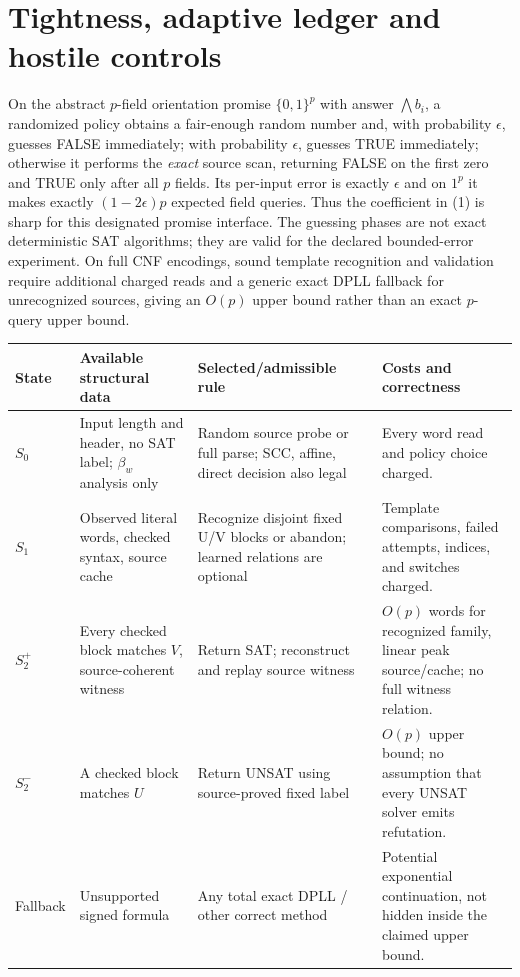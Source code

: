 \documentclass[11pt]{article}
\begin{document}
\section{Tightness, adaptive ledger and hostile controls}
On the abstract $p$-field orientation promise $\{0,1\}^p$ with answer $\bigwedge b_i$, a randomized policy obtains a fair-enough random number and, with probability $\epsilon$, guesses FALSE immediately; with probability $\epsilon$, guesses TRUE immediately; otherwise it performs the \emph{exact} source scan, returning FALSE on the first zero and TRUE only after all $p$ fields. Its per-input error is exactly $\epsilon$ and on $1^p$ it makes exactly $(1-2\epsilon)p$ expected field queries. Thus the coefficient in (1) is sharp for this designated promise interface. The guessing phases are not exact deterministic SAT algorithms; they are valid for the declared bounded-error experiment. On full CNF encodings, sound template recognition and validation require additional charged reads and a generic exact DPLL fallback for unrecognized sources, giving an $O(p)$ upper bound rather than an exact $p$-query upper bound.

\begin{center}\small
\begin{tabular}{p{.12\linewidth}p{.25\linewidth}p{.26\linewidth}p{.26\linewidth}}
\toprule
State & Available structural data & Selected/admissible rule & Costs and correctness\\\midrule
$S_0$ & Input length and header, no SAT label; $\beta_w$ analysis only & Random source probe or full parse; SCC, affine, direct decision also legal & Every word read and policy choice charged.\\
$S_1$ & Observed literal words, checked syntax, source cache & Recognize disjoint fixed U/V blocks or abandon; learned relations are optional & Template comparisons, failed attempts, indices, and switches charged.\\
$S_2^+$ & Every checked block matches $V$, source-coherent witness & Return SAT; reconstruct and replay source witness & $O(p)$ words for recognized family, linear peak source/cache; no full witness relation.\\
$S_2^-$ & A checked block matches $U$ & Return UNSAT using source-proved fixed label & $O(p)$ upper bound; no assumption that every UNSAT solver emits refutation.\\
Fallback & Unsupported signed formula & Any total exact DPLL / other correct method & Potential exponential continuation, not hidden inside the claimed upper bound.\\
\bottomrule
\end{tabular}
\end{center}
\end{document}
